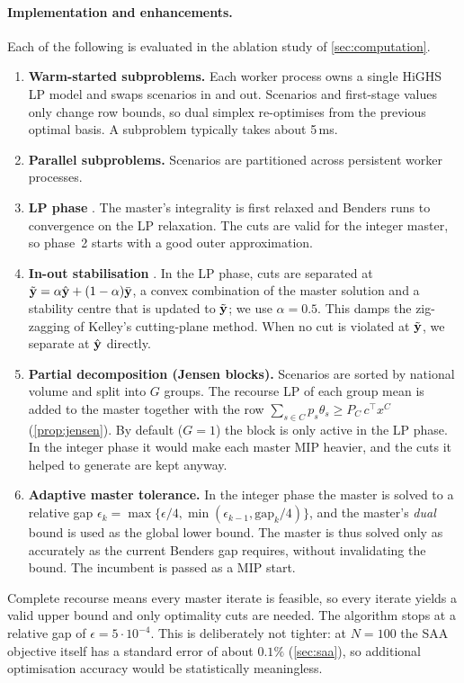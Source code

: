 \paragraph{Implementation and enhancements.} Each of the following is evaluated in the ablation study of \cref{sec:computation}.
\begin{enumerate}
  \item \textbf{Warm-started subproblems.} Each worker process owns a single HiGHS LP model \citep{huangfu2018} and swaps scenarios in and out. Scenarios and first-stage values only change row bounds, so dual simplex re-optimises from the previous optimal basis. A subproblem typically takes about 5\,ms.
  \item \textbf{Parallel subproblems.} Scenarios are partitioned across persistent worker processes.
  \item \textbf{LP phase} \citep{mcdaniel1977}. The master's integrality is first relaxed and Benders runs to convergence on the LP relaxation. The cuts are valid for the integer master, so phase~2 starts with a good outer approximation.
  \item \textbf{In-out stabilisation} \citep{benameur2007,fischetti2017}. In the LP phase, cuts are separated at $\tilde{\mathbf{y}}=\alpha\hat{\mathbf{y}}+(1-\alpha)\bar{\mathbf{y}}$, a convex combination of the master solution and a stability centre that is updated to $\tilde{\mathbf{y}}$; we use $\alpha=0.5$. This damps the zig-zagging of Kelley's cutting-plane method. When no cut is violated at $\tilde{\mathbf{y}}$, we separate at $\hat{\mathbf{y}}$ directly.
  \item \textbf{Partial decomposition (Jensen blocks).} Scenarios are sorted by national volume and split into $G$ groups. The recourse LP of each group mean is added to the master together with the row $\sum_{s\in C}p_s\theta_s\ge P_C\,c^\top x^C$ (\cref{prop:jensen}). By default ($G=1$) the block is only active in the LP phase. In the integer phase it would make each master MIP heavier, and the cuts it helped to generate are kept anyway.
  \item \textbf{Adaptive master tolerance.} In the integer phase the master is solved to a relative gap $\epsilon_k=\max\{\epsilon/4,\min(\epsilon_{k-1},\mathrm{gap}_k/4)\}$, and the master's \emph{dual} bound is used as the global lower bound. The master is thus solved only as accurately as the current Benders gap requires, without invalidating the bound. The incumbent is passed as a MIP start.
\end{enumerate}
Complete recourse means every master iterate is feasible, so every iterate yields a valid upper bound and only optimality cuts are needed.
The algorithm stops at a relative gap of $\epsilon = 5\cdot 10^{-4}$.
This is deliberately not tighter: at $N=100$ the SAA objective itself has a standard error of about $0.1\%$ (\cref{sec:saa}), so additional optimisation accuracy would be statistically meaningless.

